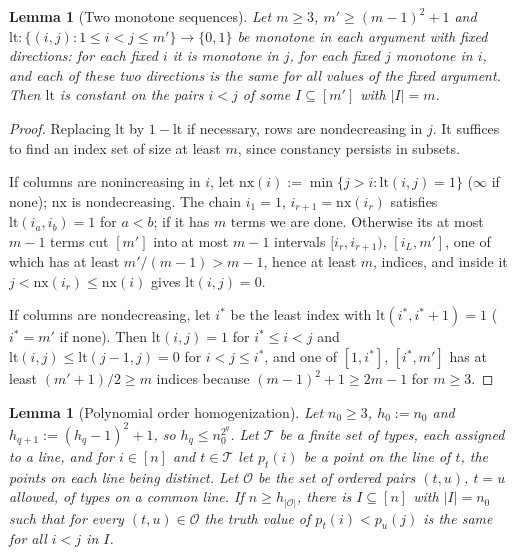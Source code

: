 \documentclass[11pt]{article}
\numberwithin{equation}{section}
\theoremstyle{plain}
\newtheorem{lemma}[theorem]{Lemma}
\theoremstyle{definition}
\theoremstyle{remark}
\theoremstyle{plain}
\begin{document}
\begin{lemma}[Two monotone sequences]
\label{lem:two-sequence}
Let $m\ge3$, $m'\ge(m-1)^2+1$ and $\mathrm{lt}:\{(i,j):1\le i<j\le m'\}\to\{0,1\}$
be monotone in each argument with fixed directions: for each fixed $i$ it is
monotone in $j$, for each fixed $j$ monotone in $i$, and each of these two
directions is the same for all values of the fixed argument.  Then $\mathrm{lt}$ is
constant on the pairs $i<j$ of some $I\subseteq[m']$ with $|I|=m$.
\end{lemma}

\begin{proof}
Replacing $\mathrm{lt}$ by $1-\mathrm{lt}$ if necessary, rows are nondecreasing in $j$.
It suffices to find an index set of size at least $m$, since constancy persists in
subsets.

If columns are nonincreasing in $i$, let $\mathrm{nx}(i):=\min\{j>i:\mathrm{lt}(i,j)=1\}$ ($\infty$ if
none); $\mathrm{nx}$ is nondecreasing.  The chain $i_1=1$, $i_{r+1}=\mathrm{nx}(i_r)$ satisfies
$\mathrm{lt}(i_a,i_b)=1$ for $a<b$; if it has $m$ terms we are done.  Otherwise its at most
$m-1$ terms cut $[m']$ into at most $m-1$ intervals $[i_r,i_{r+1})$, $[i_L,m']$, one
of which has at least $m'/(m-1)>m-1$, hence at least $m$, indices, and inside it $j<\mathrm{nx}(i_r)\le \mathrm{nx}(i)$ gives
$\mathrm{lt}(i,j)=0$.

If columns are nondecreasing, let $i^\ast$ be the least index with
$\mathrm{lt}(i^\ast,i^\ast+1)=1$ ($i^\ast=m'$ if none).  Then $\mathrm{lt}(i,j)=1$ for $i^\ast\le i<j$
and $\mathrm{lt}(i,j)\le \mathrm{lt}(j-1,j)=0$ for $i<j\le i^\ast$, and one of $[1,i^\ast]$,
$[i^\ast,m']$ has at least $(m'+1)/2\ge m$ indices because $(m-1)^2+1\ge2m-1$ for
$m\ge3$.
\end{proof}

\begin{lemma}[Polynomial order homogenization]
\label{lem:order-homogenize}
Let $n_0\ge3$, $h_0:=n_0$ and $h_{q+1}:=(h_q-1)^2+1$, so $h_q\le n_0^{2^q}$.  Let $\mathcal T$ be a
finite set of types, each assigned to a line, and for $i\in[n]$ and $t\in \mathcal T$ let
$p_t(i)$ be a point on the line of $t$, the points on each line being distinct.  Let
$\mathcal O$ be the set of ordered pairs $(t,u)$, $t=u$ allowed, of types on a common line.
If $n\ge h_{|\mathcal O|}$, there is $I\subseteq[n]$ with $|I|=n_0$ such that for
every $(t,u)\in\mathcal O$ the truth value of $p_t(i)<p_u(j)$ is the same for all $i<j$ in
$I$.
\end{lemma}
\end{document}
